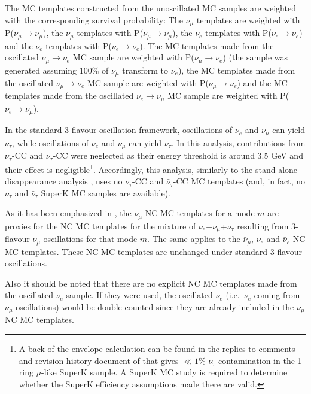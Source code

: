 The MC templates constructed from the unoscillated MC samples are weighted 
with the corresponding survival probability:
The $\nu_{\mu}$ templates are weighted with P($\nu_{\mu}\rightarrow\nu_{\mu}$),
the $\bar{\nu}_{\mu}$ templates with P($\bar{\nu}_{\mu}\rightarrow\bar{\nu}_{\mu}$),
the $\nu_{e}$ templates with P($\nu_{e}\rightarrow\nu_{e}$) and
the $\bar{\nu}_{e}$ templates with P($\bar{\nu}_{e}\rightarrow\bar{\nu}_{e}$).
The MC templates made from the oscillated $\nu_{\mu} \rightarrow \nu_{e}$ MC sample are weighted with 
P($\nu_{\mu}\rightarrow\nu_{e}$) (the sample was generated assuming 100\% of 
$\nu_{\mu}$ transform to $\nu_{e}$), 
the MC templates made from the oscillated $\bar{\nu_{\mu} }\rightarrow \bar{\nu_{e}}$ MC sample are weighted with 
P($\bar{\nu_{\mu}}\rightarrow\bar{\nu_{e}}$)
and the MC templates made from the oscillated  $\nu_{e} \rightarrow \nu_{\mu}$ MC sample are weighted with
P($\nu_{e}\rightarrow\nu_{\mu}$).

In the standard 3-flavour oscillation framework,
oscillations of $\nu_{e}$ and $\nu_{\mu}$ can yield $\nu_{\tau}$, while
oscillations of $\bar{\nu}_{e}$ and $\bar{\nu}_{\mu}$ can yield $\bar{\nu}_{\tau}$.
In this analysis, contributions from $\nu_{\tau}$-CC and $\bar{\nu}_{\tau}$-CC were neglected as their
energy threshold is around 3.5 GeV and their effect is negligible\footnote{
A back-of-the-envelope calculation can be found in the replies to
comments and revision history document of
\cite{OurRun123DisappAnalysis3Flavour} that gives $\ll 1\%$ $\nu_\tau$
contamination in the 1-ring $\mu$-like SuperK sample. A SuperK MC study is required
to determine whether the SuperK efficiency assumptions made there are valid.
  }.
Accordingly, this analysis, similarly to the stand-alone disappearance analysis \cite{OurRun1234DisappAnalysis3Flavour}, uses no $\nu_{\tau}$-CC and $\bar{\nu}_{\tau}$-CC MC templates
(and, in fact, no $\nu_{\tau}$ and $\bar{\nu}_{\tau}$ SuperK MC samples are available).

As it has been emphasized in \cite{OurRun1234DisappAnalysis3Flavour},
the $\nu_{\mu}$ NC MC templates for a mode $m$ are proxies for the
NC MC templates for the mixture of $\nu_{e}$+$\nu_{\mu}$+$\nu_{\tau}$ resulting from
3-flavour $\nu_{\mu}$ oscillations for that mode $m$. The same applies to the $\bar{\nu}_{\mu}$, $\nu_{e}$ and $\bar{\nu}_{e}$ NC MC templates.
These NC MC templates are unchanged under standard 3-flavour oscillations.%

Also it should be noted that there are no explicit NC MC templates made from the oscillated $\nu_{e}$ sample.
If they were used, the oscillated $\nu_{e}$ (i.e.\ $\nu_{e}$ coming from $\nu_{\mu}$ oscillations) would be double counted
since they are already included in the $\nu_{\mu}$ NC MC templates.

